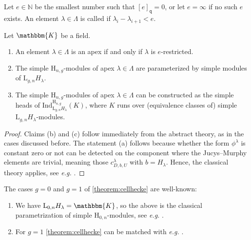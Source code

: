 \documentclass[a4paper,11pt]{amsart}
\let\emph\relax
\newcommand{\eg}{\textsl{e.g.}}
\newcommand{\setstuff}[1]{\mathrm{#1}}
\newcommand{\KK}{\mathbbm{K}}
\newcommand{\N}{\mathbb{N}}
\newcommand{\varsym}[1]{\mathtt{#1}}
\newcommand{\qvar}{\varsym{q}}
\numberwithin{equation}{section}
\let\fullref\autoref
\begin{document}
Let $e\in\N$ be the smallest number such that 
$[e]_{\qvar}=0$, or let $e=\infty$ if no such 
$e$ exists. An element $\lambda\in\Lambda$ is called 
\emph{$e$-restricted} if $\lambda_{i}-\lambda_{i+1}<e$.

\begin{theorem}\label{theorem:cellhecke}
Let $\KK$ be a field.
\begin{enumerate}

\item An element $\lambda\in\Lambda$ is an apex 
if and only if $\lambda$ is $e$-restricted.

\item The simple $\setstuff{H}_{n,g}$-modules of 
apex $\lambda\in\Lambda$ 
are parameterized by simple modules of $\setstuff{L}_{g,n}H_{\lambda}$.

\item The simple $\setstuff{H}_{n,g}$-modules of 
apex $\lambda\in\Lambda$ can be constructed as 
the simple heads of
$\mathrm{Ind}_{\setstuff{L}_{g,n}H_{\lambda}}^{\setstuff{H}_{n,g}}(K)$, 
where $K$ runs over (equivalence classes of) 
simple $\setstuff{L}_{g,n}H_{\lambda}$-modules.

\end{enumerate}
\end{theorem}

\begin{proof}
Claims (b) and (c) follow immediately from the abstract theory, as 
in the cases discussed before. The statement (a) follows 
because whether the form $\phi^{\lambda}$ is constant 
zero or not can be detected on the component where the Jucys--Murphy 
elements are trivial, meaning those $c_{D,b,U}^{\lambda}$ 
with $b=H_{\lambda}$.
Hence, the classical theory applies, see {\eg} 
\cite[Section 3.4]{Ma-hecke-schur}.
\end{proof}

\begin{example}
The cases $g=0$ and $g=1$ of \fullref{theorem:cellhecke}
are well-known:
\begin{enumerate}

\item We have $\setstuff{L}_{0,n}H_{\lambda}=\KK$, so the above 
is the classical parametrization 
of simple $\setstuff{H}_{0,n}$-modules, see {\eg} 
\cite[Section 3.4]{Ma-hecke-schur}.

\item For $g=1$ \fullref{theorem:cellhecke}
can be matched with {\eg} \cite[Theorem 5.8]{KoXi-affine-cellular}.

\end{enumerate}
\end{example}
\end{document}
